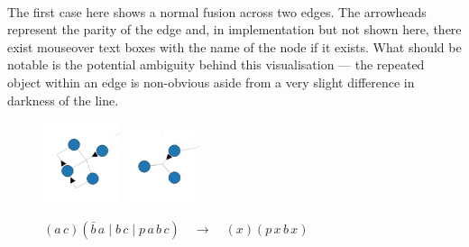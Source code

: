         \begin{examples}{~\\}\label{sssec:diagram-reductions}
            The first case here shows a normal fusion across two edges.
            The arrowheads represent the parity of the edge and, in implementation but not shown here, there exist mouseover text boxes with the name of the node if it exists.
            What should be notable is the potential ambiguity behind this visualisation --- the repeated object within an edge is non-obvious aside from a very slight difference in darkness of the line.
            \begin{figure}[H]
                \centering
                \includegraphics[width=0.2\textwidth]{diagrams/edge-edge.png}
                \hspace{1in}
                \includegraphics[width=0.2\textwidth]{diagrams/edge-edge-reduction.png}
                \caption*{$(a \, c)(\bar{b} \, a \; | \; b \, c \; | \; p \, a \, b \, c) \quad \rightarrow \quad (x)(p \, x \, b \, x)$}
            \end{figure}~\\
                        

\end{examples}
